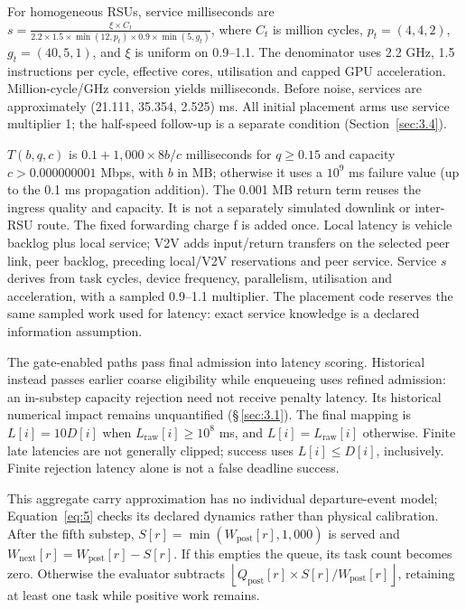 \documentclass[12pt,a4paper]{article}
\begin{document}
For homogeneous RSUs, service milliseconds are $s = \frac{\xi \times C_t}{2.2 \times 1.5 \times \min(12,p_t) \times 0.9 \times \min(5,g_t)}$, where $C_t$ is million cycles, $p_t=(4,4,2)$, $g_t=(40,5,1)$, and \ensuremath{\xi} is uniform on 0.9--1.1. The denominator uses 2.2 GHz, 1.5 instructions per cycle, effective cores, utilisation and capped GPU acceleration. Million-cycle/GHz conversion yields milliseconds. Before noise, services are approximately (21.111, 35.354, 2.525) ms. All initial placement arms use service multiplier 1; the half-speed follow-up is a separate condition (Section~\ref{sec:3.4}).

$T(b,q,c)$ is $0.1 + 1{,}000 \times 8b/c$ milliseconds for $q\geq 0.15$ and capacity $c>0.000000001$ Mbps, with $b$ in MB; otherwise it uses a $10^{9}$ ms failure value (up to the 0.1 ms propagation addition). The 0.001 MB return term reuses the ingress quality and capacity. It is not a separately simulated downlink or inter-RSU route. The fixed forwarding charge f is added once. Local latency is vehicle backlog plus local service; V2V adds input/return transfers on the selected peer link, peer backlog, preceding local/V2V reservations and peer service. Service $s$ derives from task cycles, device frequency, parallelism, utilisation and acceleration, with a sampled 0.9--1.1 multiplier. The placement code reserves the same sampled work used for latency: exact service knowledge is a declared information assumption.

The gate-enabled paths pass final admission into latency scoring. Historical  instead passes earlier coarse eligibility while enqueueing uses refined admission: an in-substep capacity rejection need not receive penalty latency. Its historical numerical impact remains unquantified (\S\,\ref{sec:3.1}). The final mapping is $L[i]=10D[i]$ when $L_{\mathrm{raw}}[i]\geq 10^{8}$ ms, and $L[i]=L_{\mathrm{raw}}[i]$ otherwise. Finite late latencies are not generally clipped; success uses $L[i]\leq D[i]$, inclusively. Finite rejection latency alone is not a false deadline success.

This aggregate carry approximation has no individual departure-event model; Equation~\eqref{eq:5} checks its declared dynamics rather than physical calibration. After the fifth substep, $S[r]=\min(W_{\mathrm{post}}[r],1{,}000)$ is served and $W_{\mathrm{next}}[r]=W_{\mathrm{post}}[r]-S[r]$. If this empties the queue, its task count becomes zero. Otherwise the evaluator subtracts $\left\lfloor Q_{\mathrm{post}}[r]\times S[r]/W_{\mathrm{post}}[r]\right\rfloor$, retaining at least one task while positive work remains.
\end{document}
